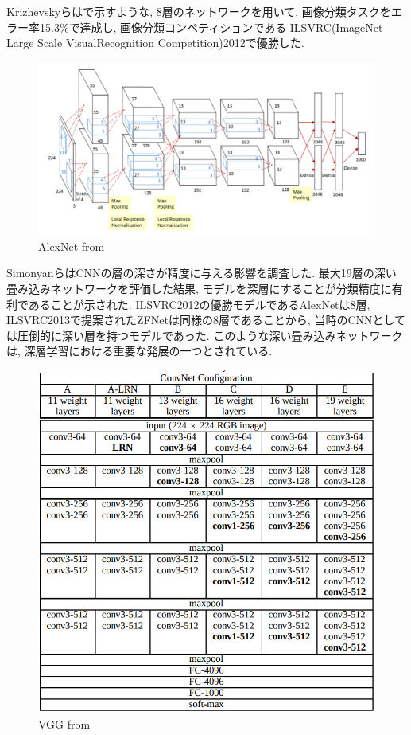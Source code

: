 Krizhevskyら\cite{AlexNet}はで示すような, 8層のネットワークを用いて, 画像分類タスクをエラー率15.3\%で達成し, 画像分類コンペティションである ILSVRC(ImageNet Large Scale VisualRecognition Competition)2012で優勝した.
\begin{figure}[hbtp]
  \centering
 \includegraphics[keepaspectratio, scale=0.55]
      {images/AlexNet.png}
 \caption{AlexNet from \cite{AlexNet}}
 \label{Fig:AlexNet}
\end{figure}
\newpage
Simonyan\cite{simonyan}らはCNNの層の深さが精度に与える影響を調査した. 最大19層の深い畳み込みネットワークを評価した結果, モデルを深層にすることが分類精度に有利であることが示された.
ILSVRC2012の優勝モデルであるAlexNetは8層, ILSVRC2013で提案されたZFNetは同様の8層であることから, 当時のCNNとしては圧倒的に深い層を持つモデルであった. このような深い畳み込みネットワークは, 深層学習における重要な発展の一つとされている.
\begin{figure}[hbtp]
  \centering
 \includegraphics[keepaspectratio, scale=0.5]
      {images/VGG.png}
 \caption{VGG from \cite{AlexNet}}
 \label{Fig:VGG}
\end{figure}


